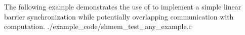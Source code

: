 \begin{apidefinition}


\begin{apiexamples}
  \apicexample
      {The following \Cstd[11] example demonstrates the use of
       to implement a simple linear barrier
      synchronization while potentially overlapping communication with
      computation.}
      {./example_code/shmem_test_any_example.c}
      {}
\end{apiexamples}

\end{apidefinition}
